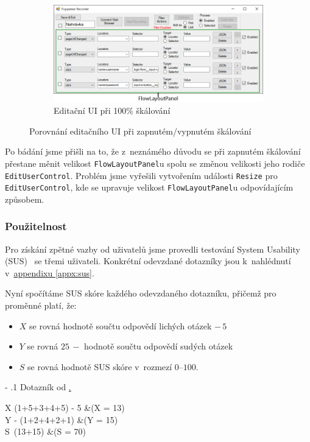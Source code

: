 \documentclass[12pt, a4paper, twoside]{article}
\makeatletter
\newcommand{\refAddedText}[3]{\hyperref[#1]{#2\ref{#1}#3}}
\renewcommand\paragraph{%
	\@startsection{subparagraph}{5}{0mm}%
	{-\baselineskip}%
	{.1\baselineskip}%
	{\normalfont\normalsize\bfseries}}
\makeatother
\begin{document}
	\begin{figure}[H]\ContinuedFloat
		\begin{subfigure}[t]{1.0\textwidth}
			\includegraphics*[width=1.0\textwidth]{scaling100correct.png}
			\caption{Editační UI při 100\% škálování}
		\end{subfigure}
		\caption{Porovnání editačního UI při zapnutém/vypnutém škálování}
	\end{figure}
	Po bádání jsme přišli na to, že z~neznámého důvodu se při zapnutém škálování přestane měnit velikost \texttt{FlowLayoutPanel}u spolu se změnou velikosti jeho rodiče \texttt{EditUserControl}. Problém jsme vyřešili vytvořením události \texttt{Resize} pro \texttt{EditUserControl}, kde se upravuje velikost \texttt{FlowLayoutPanel}u odpovídajícím způsobem.
	\subsubsection{Použitelnost}
	Pro získání zpětné vazby od uživatelů jsme provedli testování System Usability (SUS)~\cite{sus} se třemi uživateli. Konkrétní odevzdané dotazníky jsou k~nahlédnutí v~\refAddedText{appx:sus}{appendixu }{}.
	
	Nyní spočítáme SUS skóre každého odevzdaného dotazníku, přičemž pro proměnné platí, že:
	\begin{itemize}[leftmargin=16pt]
		\item[] $X$ se rovná hodnotě součtu odpovědí lichých otázek $-\,5$
		\item[] $Y$ se rovná $25\,-$ hodnotě součtu odpovědí sudých otázek
		\item[] $S$ se rovná hodnotě SUS skóre v~rozmezí $0$--$100$.
	\end{itemize}
	\paragraph{Dotazník od \hyperref[sus:mh]{.}}
	\begin{flalign*}
	X \leftarrow (1+5+3+4+5) - 5 \quad \quad \quad  &(X = 13) \\
	Y  - (1+2+4+2+1) \quad \quad \quad &(Y = 15) \\
	S~\leftarrow (13+15)  \quad \quad \quad &(S = 70)
	\end{flalign*}
\end{document}
